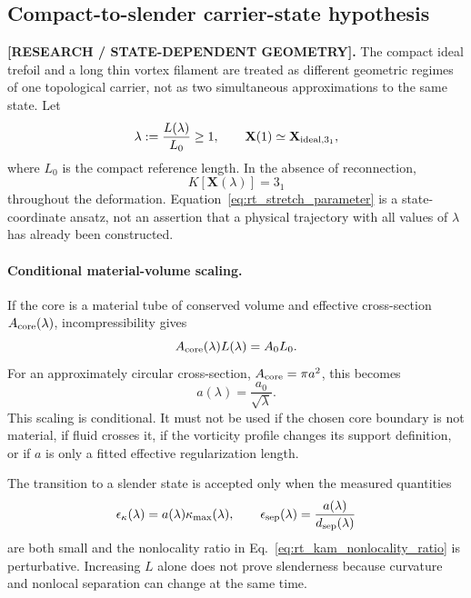 \subsection{Compact-to-slender carrier-state hypothesis}
\label{subsec:rt_compact_to_slender_state}

\textbf{[RESEARCH / STATE-DEPENDENT GEOMETRY].}
The compact ideal trefoil and a long thin vortex filament are treated as
different geometric regimes of one topological carrier, not as two
simultaneous approximations to the same state.  Let
\begin{equation}
    \lambda
    :=
    \frac{L(\lambda)}{L_0}
    \ge1,
    \qquad
    \mathbf X(1)\simeq\mathbf X_{\rm ideal,3_1},
    \label{eq:rt_stretch_parameter}
\end{equation}
where $L_0$ is the compact reference length.  In the absence of reconnection,
\begin{equation}
    K[\mathbf X(\lambda)]=3_1
    \label{eq:rt_stretch_topology_guard}
\end{equation}
throughout the deformation.  Equation~\eqref{eq:rt_stretch_parameter} is a
state-coordinate ansatz, not an assertion that a physical trajectory with all
values of $\lambda$ has already been constructed.

\paragraph{Conditional material-volume scaling.}
If the core is a material tube of conserved volume and effective cross-section
$A_{\rm core}(\lambda)$, incompressibility gives
\begin{equation}
    A_{\rm core}(\lambda)L(\lambda)
    =
    A_0L_0.
    \label{eq:rt_core_volume_conservation}
\end{equation}
For an approximately circular cross-section,
$A_{\rm core}=\pi a^2$, this becomes
\begin{equation}
    a(\lambda)
    =
    \frac{a_0}{\sqrt{\lambda}}.
    \label{eq:rt_core_radius_stretch_scaling}
\end{equation}
This scaling is conditional.  It must not be used if the chosen core boundary
is not material, if fluid crosses it, if the vorticity profile changes its
support definition, or if $a$ is only a fitted effective regularization length.

The transition to a slender state is accepted only when the measured
quantities
\begin{equation}
    \epsilon_{\kappa}(\lambda)
    =
    a(\lambda)\kappa_{\max}(\lambda),
    \qquad
    \epsilon_{\rm sep}(\lambda)
    =
    \frac{a(\lambda)}{d_{\rm sep}(\lambda)}
    \label{eq:rt_stretched_state_slenderness}
\end{equation}
are both small and the nonlocality ratio in
Eq.~\eqref{eq:rt_kam_nonlocality_ratio} is perturbative.  Increasing $L$ alone
does not prove slenderness because curvature and nonlocal separation can change
at the same time.

